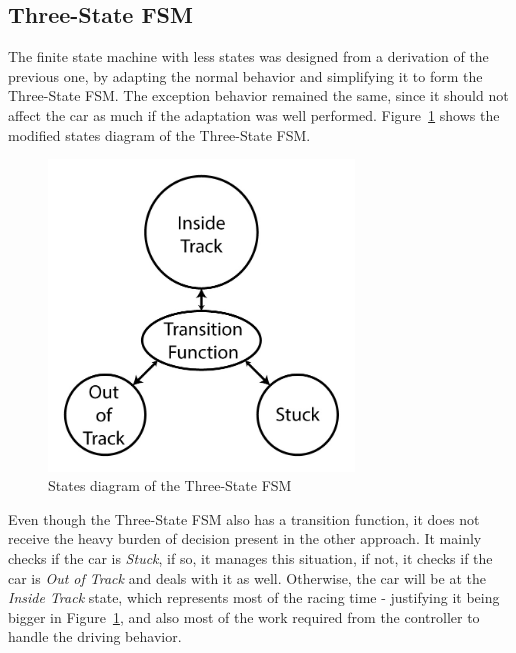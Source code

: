 \subsection{Three-State FSM} \label{subsec:FSM3}
	
	The finite state machine with less states was designed from a derivation of the previous one, by adapting the normal behavior and simplifying it to form the Three-State FSM. The exception behavior remained the same, since it should not affect the car as much if the adaptation was well performed. Figure~\ref{Fig:FSM3Diagram} shows the modified states diagram of the Three-State FSM.
	
	\begin{figure}[h]
		
		\centering
		\includegraphics[width=230pt]{ThreeStateFSM}
		\caption{States diagram of the Three-State FSM}
		\label{Fig:FSM3Diagram}
		
	\end{figure}
	
	Even though the Three-State FSM also has a transition function, it does not receive the heavy burden of decision present in the other approach. It mainly checks if the car is \emph{Stuck}, if so, it manages this situation, if not, it checks if the car is \emph{Out of Track} and deals with it as well. Otherwise, the car will be at the \emph{Inside Track} state, which represents most of the racing time - justifying it being bigger in Figure~\ref{Fig:FSM3Diagram}, and also most of the work required from the controller to handle the driving behavior.
	
